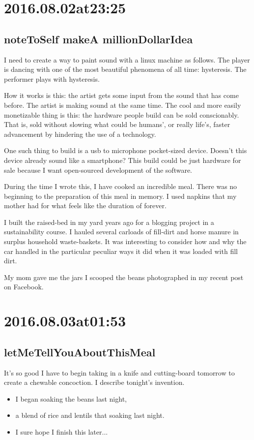 \section*{ 2016.08.02at23:25 }
\subsection*{ noteToSelf makeA millionDollarIdea }
I need to create a way to paint sound with a linux machine as follows. The player is dancing with one of the most beautiful phenomena of all time: hysteresis. The performer plays with hysteresis.

How it works is this: the artist gets some input from the sound that has come before. The artist is making sound at the same time. The cool and more easily monetizable thing is this: the hardware people build can be sold conscionably. That is, sold without slowing what could be humans', or really life's, faster advancement by hindering the use of a technology.

One such thing to build is a usb to microphone pocket-sized device. Doesn't this device already sound like a smartphone? This build could be just hardware for sale because I want open-sourced development of the software.

During the time I wrote this, I have cooked an incredible meal. There was no beginning to the preparation of this meal in memory. I used napkins that my mother had for what feels like the duration of forever.

I built the raised-bed in my yard years ago for a blogging project in a sustainability course. I hauled several carloads of fill-dirt and horse manure in surplus household waste-baskets. It was interesting to consider how and why the car handled in the particular peculiar ways it did when it was loaded with fill dirt.

My mom gave me the jars I scooped the beans photographed in my recent post on Facebook.

\section*{ 2016.08.03at01:53 }
\subsection*{ letMeTellYouAboutThisMeal }
It's so good I have to begin taking in a knife and cutting-board tomorrow to create a chewable concoction. I describe tonight's invention.
\begin{itemize}
\item I began soaking the beans last night,
\item a blend of rice and lentils that soaking last night.
\item I sure hope I finish this later...
\end{itemize}


